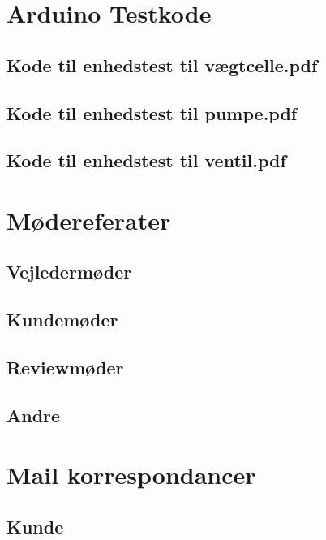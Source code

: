 \section{Arduino Testkode}

\subsection{Kode til enhedstest til vægtcelle.pdf} 
\label{bilag:TKloadcell}


\subsection{Kode til enhedstest til pumpe.pdf}
\label{bilag:TKpumpe}

\subsection{Kode til enhedstest til ventil.pdf}
\label{bilag:TKventil}

\section{Mødereferater}
\label{mode}

\subsection{Vejledermøder}
\label{modevejleder}

\subsection{Kundemøder}
\label{modekunde}

\subsection{Reviewmøder}
\label{moderefreview}

\subsection{Andre}
\label{moderefAndre}

\section{Mail korrespondancer}
\label{mails}

\subsection{Kunde}
\label{mailKunde}

